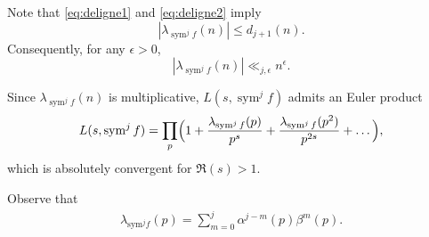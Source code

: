 \documentclass[10pt]{amsart}
\begin{document}
Note that \eqref{eq:deligne1} and \eqref{eq:deligne2} imply
\[
|\lambda_{\operatorname{sym}^{j}f}(n)| \le d_{j+1}(n).
\]
Consequently, for any $\epsilon>0$,
\begin{equation} \label{eq:lambdaSymbound}
|\lambda_{\operatorname{sym}^{j}f}(n)| \ll_{j,\epsilon} n^{\epsilon}.
\end{equation}

Since $\lambda_{\operatorname{sym}^{j}f}(n)$ is multiplicative, $L(s,\operatorname{sym}^{j}f)$ admits an Euler product
\begin{equation} \label{eq:eulerproduct}
L(s,\operatorname{sym}^{j}f) = \prod_{p} \Bigl( 1 + \frac{\lambda_{\operatorname{sym}^{j}f}(p)}{p^{s}} 
    + \frac{\lambda_{\operatorname{sym}^{j}f}(p^{2})}{p^{2s}} + \dots \Bigr),
\end{equation}
which is absolutely convergent for $\Re(s) > 1$.

Observe that
\begin{align} \label{eq:lambdaatp}
\lambda_{\mathrm{sym}^{j}f}(p)=\sum_{m=0}^{j}\alpha^{j-m}(p)\beta^{m}(p).
\end{align}
\end{document}
